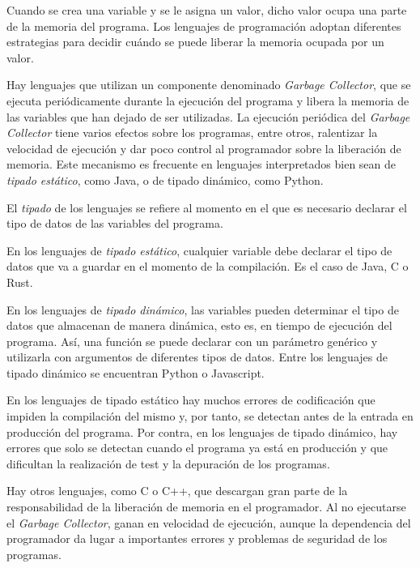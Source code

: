 \documentclass[a4paper,11pt]{extarticle}
\begin{document}
Cuando se crea una variable y se le asigna un valor, dicho valor ocupa una parte de la memoria del programa. Los lenguajes de programación adoptan diferentes estrategias para decidir cuándo se puede liberar la memoria ocupada por un valor.

Hay lenguajes que utilizan un componente denominado \textit{Garbage Collector}, que se ejecuta periódicamente durante la ejecución del programa y libera la memoria de las variables que han dejado de ser utilizadas. La ejecución periódica del \textit{Garbage Collector} tiene varios efectos sobre los programas, entre otros, ralentizar la velocidad de ejecución y dar poco control al programador sobre la liberación de memoria. Este mecanismo es frecuente en lenguajes interpretados bien sean de \textit{tipado estático}, como Java, o de tipado dinámico, como Python.

\begin{Nota}
	\small
	El \textit{tipado} de los lenguajes se refiere al momento en el que es necesario declarar el tipo de datos de las variables del programa. 
	
	En los lenguajes de \textit{tipado estático}, cualquier variable debe declarar el tipo de datos que va a guardar en el momento de la compilación. Es el caso de Java, C o Rust.
	
	En los lenguajes de \textit{tipado dinámico}, las variables pueden determinar  el tipo de datos que almacenan de manera dinámica, esto es, en tiempo de ejecución del programa. Así, una función se puede declarar con un parámetro genérico y utilizarla con argumentos de diferentes tipos de datos. Entre los lenguajes de tipado dinámico se encuentran Python o Javascript.
	
	En los lenguajes de tipado estático hay muchos errores de codificación que impiden la compilación del mismo y, por tanto, se detectan antes de la entrada en producción del programa. Por contra, en los lenguajes de tipado dinámico, hay errores que solo se detectan cuando el programa ya está en producción y que dificultan la realización de test y la depuración de los programas.
\end{Nota}
\vspace{1em}

Hay otros lenguajes, como C o C++, que descargan gran parte de la responsabilidad de la liberación de memoria en el programador. Al no ejecutarse el \textit{Garbage Collector}, ganan en velocidad de ejecución, aunque la dependencia del programador da lugar a importantes errores y problemas de seguridad de los programas.
\end{document}
